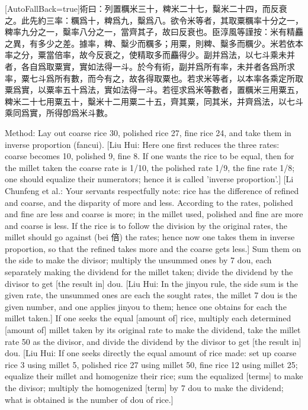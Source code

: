 \documentclass[11pt]{article}
\newcommand{\zhsmall}{\footnotesize\color{black!70}}
\newcommand{\unitlabel}[1]{\marginpar{\raggedleft\tiny\color{gray}#1}}
\newenvironment{unitzh}{\par\CJKfontspec{Noto Serif CJK SC}[AutoFallBack=true]\large\linespread{1.25}\selectfont}{\par}
\newenvironment{uniten}{\par\small\color{black!85}}{\par\medskip}
\begin{document}
\begin{unitzh}\unitlabel{jiuzhang-024.5}術曰：列置糲米三十，粺米二十七，糳米二十四，而反衰之。{\zhsmall 此先約三率：糲爲十，粺爲九，糳爲八。欲令米等者，其取粟糲率十分之一，粺率九分之一，糳率八分之一，當齊其子，故曰反衰也。臣淳風等謹按：米有精麤之異，有多少之差。據率，粺、糳少而糲多；用粟，則粺、糳多而糲少。米若依本率之分，粟當倍率，故今反衰之，使精取多而麤得少。}副并爲法，以七斗乘未并者，各自爲取粟實，實如法得一斗。{\zhsmall 於今有術，副并爲所有率，未并者各爲所求率，粟七斗爲所有數，而今有之，故各得取粟也。}若求米等者，以本率各乘定所取粟爲實，以粟率五十爲法，實如法得一斗。{\zhsmall 若徑求爲米等數者，置糲米三用粟五，粺米二十七用粟五十，糳米十二用粟二十五，齊其粟，同其米，并齊爲法，以七斗乘同爲實，所得卽爲米斗數。}\end{unitzh}
\begin{uniten}Method: Lay out coarse rice 30, polished rice 27, fine rice 24, and take them in inverse proportion (fancui). [Liu Hui: Here one first reduces the three rates: coarse becomes 10, polished 9, fine 8. If one wants the rice to be equal, then for the millet taken the coarse rate is 1/10, the polished rate 1/9, the fine rate 1/8; one should equalize their numerators; hence it is called 'inverse proportion'.] [Li Chunfeng et al.: Your servants respectfully note: rice has the difference of refined and coarse, and the disparity of more and less. According to the rates, polished and fine are less and coarse is more; in the millet used, polished and fine are more and coarse is less. If the rice is to follow the division by the original rates, the millet should go against (bei 倍) the rates; hence now one takes them in inverse proportion, so that the refined takes more and the coarse gets less.] Sum them on the side to make the divisor; multiply the unsummed ones by 7 dou, each separately making the dividend for the millet taken; divide the dividend by the divisor to get [the result in] dou. [Liu Hui: In the jinyou rule, the side sum is the given rate, the unsummed ones are each the sought rates, the millet 7 dou is the given number, and one applies jinyou to them; hence one obtains for each the millet taken.] If one seeks the equal [amount of] rice, multiply each determined [amount of] millet taken by its original rate to make the dividend, take the millet rate 50 as the divisor, and divide the dividend by the divisor to get [the result in] dou. [Liu Hui: If one seeks directly the equal amount of rice made: set up coarse rice 3 using millet 5, polished rice 27 using millet 50, fine rice 12 using millet 25; equalize their millet and homogenize their rice; sum the equalized [terms] to make the divisor; multiply the homogenized [term] by 7 dou to make the dividend; what is obtained is the number of dou of rice.]\end{uniten}
\end{document}
